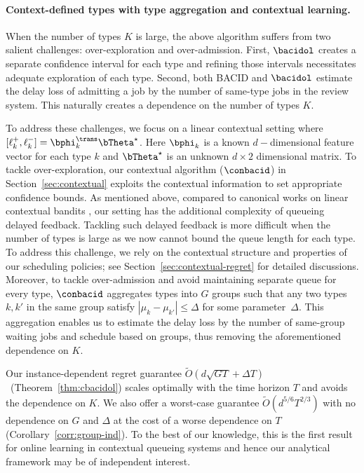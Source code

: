 \paragraph{Context-defined types with type aggregation and contextual learning.} When the number of types $K$ is large, the above algorithm suffers from two salient challenges: over-exploration and over-admission. First, $\bacidol$ creates a separate confidence interval for each type and refining those intervals necessitates adequate exploration of each type. Second, both \textsc{BACID} and $\bacidol$ estimate the delay loss of admitting a job by the number of same-type jobs in the review system. This naturally creates a dependence on the number of types $K$. 

To address these challenges, we focus on a linear contextual setting where $[\ell_k^+,\ell_k^-] = \bphi_k^{\trans}\bTheta^\star$. Here $\bphi_k$ is a known $d-$dimensional feature vector for each type $k$ and $\bTheta^\star$ is an unknown $d \times 2$ dimensional matrix. 
To tackle over-exploration, our contextual algorithm ($\conbacid$) in Section~\ref{sec:contextual} exploits the contextual information to set appropriate confidence bounds. As mentioned above, compared to canonical works on linear contextual bandits \citep{Abbasi-YadkoriPS11}, our setting has the additional complexity of queueing delayed feedback. Tackling such delayed feedback is more difficult when the number of types is large as we now cannot bound the queue length for each type. To address this challenge, we rely on the contextual structure and properties of our scheduling policies; see Section~\ref{sec:contextual-regret} for detailed discussions. Moreover, to tackle over-admission and avoid maintaining separate queue for every type, $\conbacid$ 
aggregates types into $G$ groups such that any two types $k,k'$ in the same group satisfy $|\mu_k - \mu_{k'}| \leq \Delta$ for some parameter~$\Delta$. This aggregation enables us to estimate the delay loss by the number of same-group waiting jobs and schedule based on groups, thus removing the aforementioned dependence on $K$. 

 
Our instance-dependent regret guarantee $\tilde{O}(d\sqrt{GT}+\Delta T)$~(Theorem~\ref{thm:cbacidol}) scales optimally with the time horizon $T$ and avoids the dependence on $K$. We also offer a worst-case guarantee $\tilde{O}(d^{5/6}T^{2/3})$ with no dependence on $G$ and $\Delta$ at the cost of a worse dependence on $T$ (Corollary~\ref{corr:group-ind}). To the best of our knowledge, this is the first result for online learning in contextual queueing systems and hence our analytical framework may be of independent interest.


